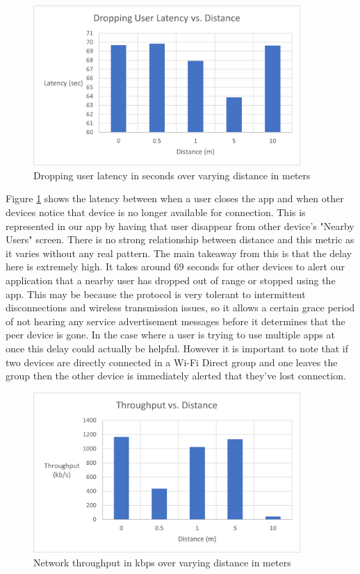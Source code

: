 \documentclass[10pt]{article}
\begin{document}
\begin{figure}[h!]
    \centering
    \includegraphics[width=4in]{dropping_user_latency_graph.png}
    \caption{Dropping user latency in seconds over varying distance in meters}
    \label{results:dropping_user}
\end{figure}

Figure \ref{results:dropping_user} shows the latency between when a user closes the app and when other devices notice that device is no longer available for connection. This is represented in our app by having that user disappear from other device's "Nearby Users" screen. There is no strong relationship between distance and this metric as it varies without any real pattern. The main takeaway from this is that the delay here is extremely high. It takes around 69 seconds for other devices to alert our application that a nearby user has dropped out of range or stopped using the app. This may be because the protocol is very tolerant to intermittent disconnections and wireless transmission issues, so it allows a certain grace period of not hearing any service advertisement messages before it determines that the peer device is gone. In the case where a user is trying to use multiple apps at once this delay could actually be helpful. However it is important to note that if two devices are directly connected in a Wi-Fi Direct group and one leaves the group then the other device is immediately alerted that they've lost connection.

\begin{figure}[h!]
    \centering
    \includegraphics[width=4in]{throughput_graph.png}
    \caption{Network throughput in kbps over varying distance in meters}
    \label{results:throughput}
\end{figure}
\end{document}
